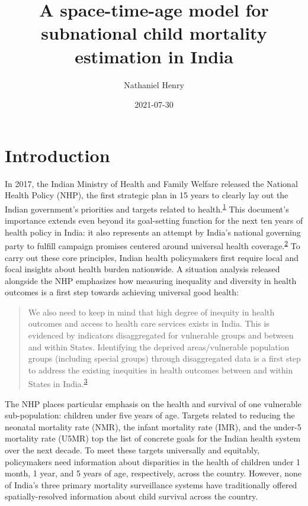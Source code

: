\documentclass[
]{article}
\title{A space-time-age model for subnational child mortality estimation in India}
\author{Nathaniel Henry\textsuperscript{}}
\date{2021-07-30}
\begin{document}
\maketitle

\hypertarget{introduction}{%
\section{Introduction}\label{introduction}}

In 2017, the Indian Ministry of Health and Family Welfare released the National Health Policy (NHP), the first strategic plan in 15 years to clearly lay out the Indian government's priorities and targets related to health.\textsuperscript{\protect\hyperlink{ref-IND_MOHFW2017}{1}} This document's importance extends even beyond its goal-setting function for the next ten years of health policy in India: it also represents an attempt by India's national governing party to fulfill campaign promises centered around universal health coverage.\textsuperscript{\protect\hyperlink{ref-Sundararaman2017}{2}} To carry out these core principles, Indian health policymakers first require local and focal insights about health burden nationwide. A situation analysis released alongside the NHP emphasizes how measuring inequality and diversity in health outcomes is a first step towards achieving universal good health:

\begin{quote}
We also need to keep in mind that high degree of inequity in health outcomes and access to health care services exists in India. This is evidenced by indicators disaggregated for vulnerable groups and between and within States. Identifying the deprived areas/vulnerable population groups (including special groups) through disaggregated data is a first step to address the existing inequities in health outcomes between and within States in India.\textsuperscript{\protect\hyperlink{ref-IND_MOHFW2017a}{3}}
\end{quote}

The NHP places particular emphasis on the health and survival of one vulnerable sub-population: children under five years of age. Targets related to reducing the neonatal mortality rate (NMR), the infant mortality rate (IMR), and the under-5 mortality rate (U5MR) top the list of concrete goals for the Indian health system over the next decade. To meet these targets universally and equitably, policymakers need information about disparities in the health of children under 1 month, 1 year, and 5 years of age, respectively, across the country. However, none of India's three primary mortality surveillance systems have traditionally offered spatially-resolved information about child survival across the country.
\end{document}
